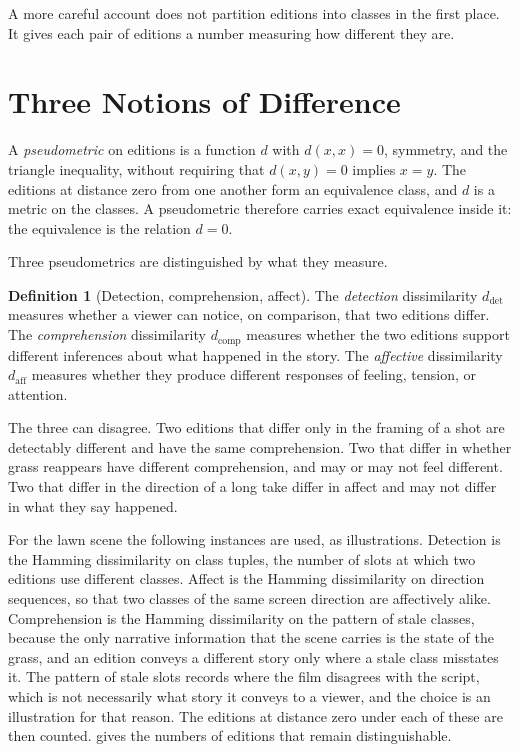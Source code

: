 \documentclass[11pt,twoside,openright]{book}
\theoremstyle{plain}
\theoremstyle{definition}
\newtheorem{definition}[theorem]{Definition}
\theoremstyle{remark}
\begin{document}
A more careful account does not partition editions into classes in the first place. It gives each pair of editions a number measuring how different they are.

\section{Three Notions of Difference}\label{sec:three2}

A \emph{pseudometric} on editions is a function $d$ with $d(x,x)=0$, symmetry, and the triangle inequality, without requiring that $d(x,y)=0$ implies $x=y$. The editions at distance zero from one another form an equivalence class, and $d$ is a metric on the classes. A pseudometric therefore carries exact equivalence inside it: the equivalence is the relation $d=0$.

Three pseudometrics are distinguished by what they measure.

\begin{definition}[Detection, comprehension, affect]\label{def:three}
The \emph{detection} dissimilarity $d_{\mathrm{det}}$ measures whether a viewer can notice, on comparison, that two editions differ. The \emph{comprehension} dissimilarity $d_{\mathrm{comp}}$ measures whether the two editions support different inferences about what happened in the story. The \emph{affective} dissimilarity $d_{\mathrm{aff}}$ measures whether they produce different responses of feeling, tension, or attention.
\end{definition}

The three can disagree. Two editions that differ only in the framing of a shot are detectably different and have the same comprehension. Two that differ in whether grass reappears have different comprehension, and may or may not feel different. Two that differ in the direction of a long take differ in affect and may not differ in what they say happened.

For the lawn scene the following instances are used, as illustrations. Detection is the Hamming dissimilarity on class tuples, the number of slots at which two editions use different classes. Affect is the Hamming dissimilarity on direction sequences, so that two classes of the same screen direction are affectively alike. Comprehension is the Hamming dissimilarity on the pattern of stale classes, because the only narrative information that the scene carries is the state of the grass, and an edition conveys a different story only where a stale class misstates it. The pattern of stale slots records where the film disagrees with the script, which is not necessarily what story it conveys to a viewer, and the choice is an illustration for that reason. The editions at distance zero under each of these are then counted.  gives the numbers of editions that remain distinguishable.
\end{document}
